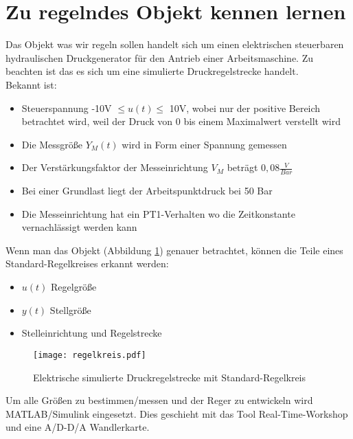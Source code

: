 
\newpage
\section{Zu regelndes Objekt kennen lernen}
Das Objekt was wir regeln sollen handelt sich um einen elektrischen steuerbaren hydraulischen Druckgenerator für den Antrieb einer Arbeitsmaschine. Zu beachten ist das es sich um eine simulierte Druckregelstrecke handelt.\\

Bekannt ist:
\begin{itemize}
\item Steuerspannung -10V $\leq u(t) \leq$ 10V, wobei nur der positive Bereich betrachtet wird, weil der Druck von 0 bis einem Maximalwert verstellt wird

\item Die Messgröße $Y_{M}(t)$ wird in Form einer Spannung gemessen

\item Der Verstärkungsfaktor der Messeinrichtung $V_{M}$ beträgt $0,08\frac{V}{Bar}$

\item Bei einer Grundlast liegt der Arbeitspunktdruck bei 50 Bar

\item Die Messeinrichtung hat ein PT1-Verhalten wo die Zeitkonstante vernachlässigt werden kann 
\end{itemize}


Wenn man das Objekt (Abbildung \ref{RegelKreis}) genauer betrachtet, können die Teile eines Standard-Regelkreises erkannt werden:
\begin{itemize}
\item $u(t)$ Regelgröße
\item $y(t)$ Stellgröße
\item Stelleinrichtung und Regelstrecke
\end{itemize}

\begin{figure}[htbp]
	\begin{center}
		\texttt{[image: regelkreis.pdf]}
		\caption{Elektrische simulierte Druckregelstrecke mit Standard-Regelkreis}
       \label{RegelKreis}
	\end{center} 
\end{figure}

\newpage

Um alle Größen zu bestimmen/messen und der Reger zu entwickeln wird MATLAB/Simulink eingesetzt. Dies geschieht mit das Tool Real-Time-Workshop und eine A/D-D/A Wandlerkarte.


